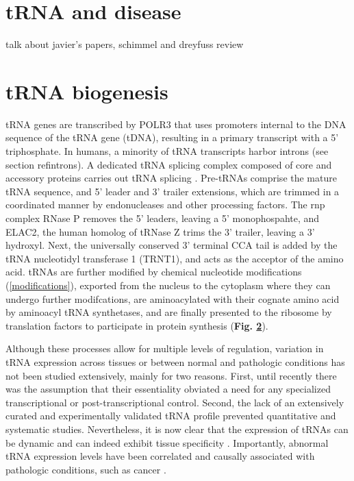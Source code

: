 \documentclass[12pt]{rockefeller}
\begin{document}
\section{tRNA and disease} 
talk about javier's papers, schimmel and dreyfuss review

\section{tRNA biogenesis}\label{biogenesis}
tRNA genes are transcribed by POLR3 that uses promoters internal to the DNA sequence of the tRNA gene (tDNA), resulting in a primary transcript with a 5' triphosphate. In humans, a minority of tRNA transcripts harbor introns (see section ref{introns}). A dedicated tRNA splicing complex composed of core and accessory proteins carries out tRNA splicing \cite{trotta1999trna,Paushkin:2004wl,Weitzer:2007hda, Popow:2011ffa,Popow:2014ita}. Pre-tRNAs comprise the mature tRNA sequence, and 5' leader and 3' trailer extensions, which are trimmed in a coordinated manner by endonucleases and other processing factors. The \gls{rnp} complex RNase P removes the 5' leaders, leaving a 5' monophospahte, and ELAC2, the human homolog of tRNase Z trims the 3' trailer, leaving a 3' \gls{hydroxyl}. Next, the universally conserved 3' terminal CCA tail is added by the tRNA nucleotidyl transferase 1 (TRNT1), and acts as the acceptor of the amino acid. tRNAs are further modified by chemical nucleotide modifications (\ref{modifications}), exported from the nucleus to the cytoplasm where they can undergo further modifcations, are aminoacylated with their cognate amino acid by aminoacyl tRNA synthetases, and are finally presented to the ribosome by translation factors to participate in protein synthesis (\textbf{Fig. \ref{biogenesis}})\cite{Phizicky:2010jf,Hopper:2010ho,Hopper:2013dl}.

Although these processes allow for multiple levels of regulation, variation in tRNA expression across tissues or between normal and pathologic conditions has not been studied extensively, mainly for two reasons. First, until recently there was the assumption that their essentiality obviated a need for any specialized transcriptional or post-transcriptional control. Second, the lack of an extensively curated and experimentally validated tRNA profile prevented quantitative and systematic studies. Nevertheless, it is now clear that the expression of tRNAs can be dynamic and can indeed exhibit tissue specificity \cite{Dittmar:2006du,Gingold:2014iz}. Importantly, abnormal tRNA expression levels have been correlated and causally associated with pathologic conditions, such as cancer \cite{Gingold:2014iz,Goodarzi:2016gd}.
\newpage
\end{document}

